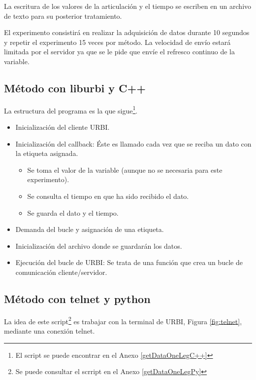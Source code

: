 \documentclass[12pt,a4paper,final,twoside]{book}
\begin{document}
La escritura de los valores de la articulación y el tiempo se escriben en un archivo de texto para su posterior tratamiento.

El experimento consistirá en realizar la adquisición de datos durante 10 segundos y repetir el experimento 15 veces por método. La velocidad de envío estará limitada por el servidor ya que se le pide que envíe el refresco continuo de la variable.

\subsection{Método con liburbi y C++}

La estructura del programa es la que sigue\footnote{El script se puede encontrar en el Anexo \ref{getDataOneLegC++}}. 

\begin{itemize}
\item Inicialización del cliente URBI.
\item Inicialización del callback: Éste es llamado cada vez que se reciba un dato con la etiqueta asignada. 
\begin{itemize}
\item Se toma el valor de la variable (aunque no se necesaria para este experimento).
\item Se consulta el tiempo en que ha sido recibido el dato.
\item Se guarda el dato y el tiempo.
\end{itemize}
\item Demanda del bucle y asignación de una etiqueta.
\item Inicialización del archivo donde se guardarán los datos.
\item Ejecución del bucle de URBI: Se trata de una función que crea un bucle de comunicación cliente/servidor. 
\end{itemize}

\subsection{Método con telnet y python}
La idea de este script\footnote{Se puede consultar el scrript en el Anexo \ref{getDataOneLegPy}} es trabajar con la terminal de URBI, Figura \ref{fig:telnet},  mediante una conexión telnet.
\end{document}
